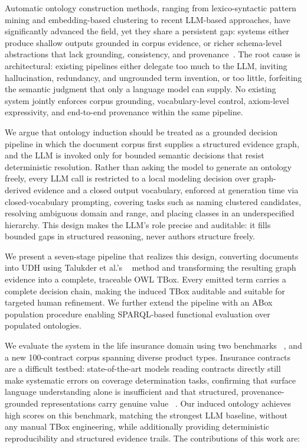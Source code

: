 \documentclass[sigconf]{acmart}
\begin{document}
Automatic ontology construction methods, ranging from lexico-syntactic pattern mining  and embedding-based clustering to recent LLM-based approaches, have significantly  advanced the field, yet they share a persistent gap: systems either produce shallow outputs grounded in corpus evidence, or richer schema-level abstractions that lack 
grounding, consistency, and provenance~\cite{du2024short, lourdusamy2019survey, bakker2024ontology, babaei2023llms4ol}. The root cause is architectural: existing pipelines either delegate too much to the LLM, inviting hallucination, redundancy, and ungrounded term invention, or too little, forfeiting the semantic judgment that only a language model can supply. No existing system jointly enforces corpus grounding, vocabulary-level control, axiom-level expressivity, and end-to-end provenance within the same pipeline.

We argue that ontology induction should be treated as a grounded decision pipeline in  which the document corpus first supplies a structured evidence graph, and the LLM is  invoked only for bounded semantic decisions that resist deterministic resolution. Rather than asking the model to generate an ontology freely, every LLM call is restricted to a local modeling decision over graph-derived evidence and a closed output vocabulary, enforced at generation time via closed-vocabulary prompting, covering tasks such as naming clustered candidates, resolving ambiguous domain and range, and placing classes in an underspecified hierarchy. This design makes the LLM's role precise and auditable: it fills bounded gaps in structured reasoning, never authors structure freely.

We present a seven-stage pipeline that realizes this design, converting  documents into UDH using Talukder et al.'s ~\cite{udh2026} method and transforming the resulting graph  evidence into a complete, traceable OWL TBox. Every emitted term carries a complete decision chain, making the induced TBox auditable and suitable for targeted human refinement. We further extend the pipeline with an ABox population procedure enabling SPARQL-based functional  evaluation over populated ontologies.

We evaluate the system in the life insurance domain using two benchmarks ~\cite{mridul2026benchmark, talukder2026towards}, and a new 100-contract corpus spanning diverse product types. Insurance contracts are a difficult testbed: state-of-the-art models reading contracts directly still make systematic errors on coverage determination tasks, confirming that surface language understanding alone is insufficient and that structured, provenance-grounded representations carry genuine value ~\cite{mridul2026benchmark}. Our induced ontology achieves high scores on this benchmark, matching the strongest LLM baseline, without any manual TBox engineering, while additionally providing deterministic reproducibility and structured evidence trails. The contributions of this work are:
\end{document}
